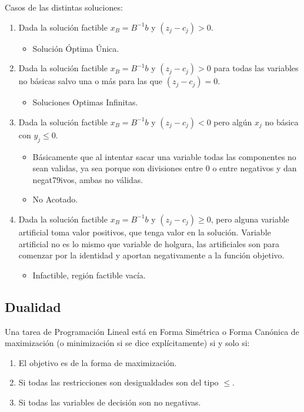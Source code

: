\documentclass[12pt, twoside, openright]{report} %
\begin{document}
  Casos de las distintas soluciones: 
 \begin{enumerate}
	 \item Dada la solución factible
	 \(x_B=B^{-1}b\) y \((z_j-c_j) > 0\). 
	 \begin{itemize}
		 \item Solución Óptima Única. 
	 \end{itemize}
	 \item Dada la solución factible \(x_B=B^{-1}b\) y \((z_j-c_j) > 0\) para todas
	 las variables no básicas salvo una o más para las que
	 \((z_j-c_j) = 0\).
	 \begin{itemize}
		\item Soluciones Optimas Infinitas. 
	\end{itemize}
	 \item Dada la solución factible \(x_B=B^{-1}b\) y \((z_j-c_j) < 0\) pero algún \(x_j\) no
	 básica con \(y_j \leq 0\).
	 \begin{itemize}
		 \item Básicamente que al intentar sacar una
		 variable todas las componentes no sean validas, ya sea porque son
		 divisiones entre 0 o entre negativos y dan negat79ivos, ambas no
		 válidas. 
		 \item No Acotado. 
	 \end{itemize}
	 
	 \item Dada la solución factible \(x_B=B^{-1}b\) y
	 \((z_j-c_j) \geq 0\), pero alguna variable artificial toma valor
	 positivos, que tenga valor en la solución. Variable artificial no es
	 lo mismo que variable de holgura, las artificiales son para comenzar
	 por la identidad y aportan negativamente a la función objetivo.
	 \begin{itemize}
		\item Infactible, región factible vacía.
	\end{itemize} 	 
 \end{enumerate} 
\pagebreak
\subsection{Dualidad}

Una tarea de Programación Lineal está en Forma Simétrica o Forma
Canónica de maximización (o minimización si se dice explícitamente) si
y solo si: 

\begin{enumerate}
	\item El objetivo es de la forma de maximización.
	\item Si todas las restricciones son desigualdades son del tipo $\leq$.
	\item Si todas las variables de decisión son no negativas.
\end{enumerate}
\end{document}
